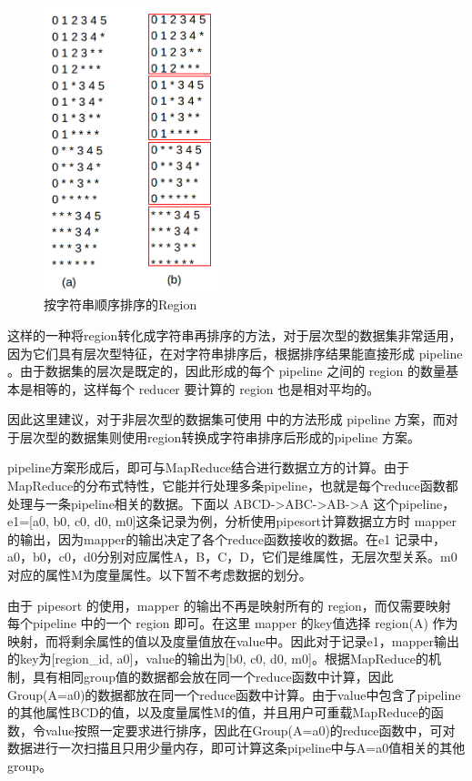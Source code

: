 \begin{figure}[!ht] 
\centering\includegraphics[width=2in]{picture/ch_terasort_mr/sorted_region} 
\caption{按字符串顺序排序的Region}\label{sorted_region} 
\end{figure}

这样的一种将region转化成字符串再排序的方法，对于层次型的数据集非常适用，因为它们具有层次型特征，在对字符串排序后，根据排序结果能直接形成 pipeline 。由于数据集的层次是既定的，因此形成的每个 pipeline 之间的 region 的数量基本是相等的，这样每个 reducer 要计算的 region 也是相对平均的。

因此这里建议，对于非层次型的数据集可使用 \cite{wang2013scalable} 中的方法形成 pipeline 方案，而对于层次型的数据集则使用region转换成字符串排序后形成的pipeline 方案。

pipeline方案形成后，即可与MapReduce结合进行数据立方的计算。由于MapReduce的分布式特性，它能并行处理多条pipeline，也就是每个reduce函数都处理与一条pipeline相关的数据。下面以 ABCD-\textgreater ABC-\textgreater AB-\textgreater A 这个pipeline，e1=[a0, b0, c0, d0, m0]这条记录为例，分析使用pipesort计算数据立方时 mapper 的输出，因为mapper的输出决定了各个reduce函数接收的数据。在e1 记录中，a0，b0，c0，d0分别对应属性A，B，C，D，它们是维属性，无层次型关系。m0对应的属性M为度量属性。以下暂不考虑数据的划分。

由于 pipesort 的使用，mapper 的输出不再是映射所有的 region，而仅需要映射 每个pipeline 中的一个 region 即可。在这里 mapper 的key值选择 region(A) 作为映射，而将剩余属性的值以及度量值放在value中。因此对于记录e1，mapper输出的key为[region\_id, a0]，value的输出为[b0, c0, d0, m0]。根据MapReduce的机制，具有相同group值的数据都会放在同一个reduce函数中计算，因此Group(A=a0)的数据都放在同一个reduce函数中计算。由于value中包含了pipeline的其他属性BCD的值，以及度量属性M的值，并且用户可重载MapReduce的函数，令value按照一定要求进行排序，因此在Group(A=a0)的reduce函数中，可对数据进行一次扫描且只用少量内存，即可计算这条pipeline中与A=a0值相关的其他group。

